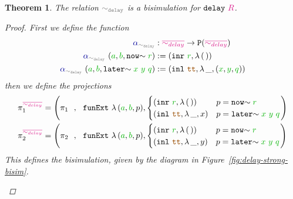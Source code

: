 \documentclass[twoside,11pt,openright]{report}
\theoremstyle{plain} %
\newtheorem{thm}{Theorem}[section]
\theoremstyle{definition}
\theoremstyle{remark}
\newcommand*{\figref}[1]{Figure~\ref{fig:#1}}
\newcommand*{\term}[1]{\textcolor{green!70!black}{#1}} %
\newcommand*{\type}[1]{\textcolor{magenta!90!black}{#1}}
\newcommand*{\relation}[1]{\textcolor{gray}{\ensuremath{\mathtt{#1}}}}
\newcommand*{\constant}[1]{\textcolor{orange!60!black}{\ensuremath{\mathtt{#1}}}}
\newcommand*{\function}[1]{\textcolor{blue!60!black}{\ensuremath{\mathtt{#1}}}}
\newcommand*{\typeformer}[1]{\ensuremath{\mathtt{#1}}}
\newcommand*{\functor}[1]{\ensuremath{\mathbf{\mathtt{#1}}}}
\begin{document}
\begin{thm}
  The relation \(\relation{\sim_{delay}}\) is a bisimulation for \(\typeformer{delay}~\type{R}\).
  \begin{proof}
    First we define the function
    \begin{equation}
      \begin{aligned}
        \function{\alpha}_{\relation{\sim_{delay}}} &: \type{\overline{\sim_{delay}}} \rightarrow \functor{P} (\type{\overline{\sim_{delay}}}) \\
        \function{\alpha}_{\relation{\sim_{delay}}}~(\term{a} , \term{b} , \mathtt{now}\hspace{-1mm}\sim\term{r}) &:= (\mathtt{inr}~\term{r} , \lambda\,(\,)) \\
        \function{\alpha}_{\relation{\sim_{delay}}}~(\term{a} , \term{b} , \mathtt{later}\hspace{-1mm}\sim\term{x}~\term{y}~\term{q}) &:= (\mathtt{inl}~\constant{tt} , \lambda\,\_, (\term{x} , \term{y} , \term{q}))
      \end{aligned}
    \end{equation}
    then we define the projections
      \begin{align}
        \pi_1^{\type{\overline{\sim_{delay}}}} &= \left( \pi_1 ~~ , ~~ \texttt{funExt}~\lambda\,(\term{a},\term{b},p), \begin{cases} (\mathtt{inr}~\term{r} , \lambda\,(\,)) & p = \mathtt{now}\hspace{-1mm}\sim\term{r} \\ (\mathtt{inl}~\constant{tt} , \lambda\,\_, x) & p = \mathtt{later}\hspace{-1mm}\sim\term{x}~\term{y}~\term{q}\end{cases} \right) \\
        \pi_2^{\type{\overline{\sim_{delay}}}} &= \left( \pi_2 ~~ , ~~ \texttt{funExt}~\lambda\,(\term{a},\term{b},p), \begin{cases} (\mathtt{inr}~\term{r} , \lambda\,(\,)) & p = \mathtt{now}\hspace{-1mm}\sim\term{r} \\ (\mathtt{inl}~\constant{tt} , \lambda\,\_, y) & p = \mathtt{later}\hspace{-1mm}\sim\term{x}~\term{y}~\term{q}\end{cases} \right) \\
      \end{align}
      This defines the bisimulation, given by the diagram in \figref{delay-strong-bisim}.
      \begin{figure}[h]

\end{figure}
\end{proof}
\end{thm}
\end{document}
